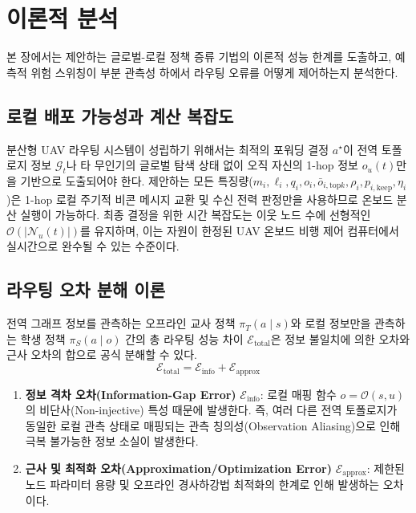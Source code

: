 \section{이론적 분석}
\label{sec:이론적분석}

본 장에서는 제안하는 글로벌-로컬 정책 증류 기법의 이론적 성능 한계를 도출하고, 예측적 위험 스위칭이 부분 관측성 하에서 라우팅 오류를 어떻게 제어하는지 분석한다.

\subsection{로컬 배포 가능성과 계산 복잡도}
분산형 UAV 라우팅 시스템이 성립하기 위해서는 최적의 포워딩 결정 $a^\star$이 전역 토폴로지 정보 $\mathcal{G}_t$나 타 무인기의 글로벌 탐색 상태 없이 오직 자신의 1-hop 정보 $o_u(t)$만을 기반으로 도출되어야 한다.  제안하는 모든 특징량($m_i, \ell_i, q_i, o_i, \bar{o}_{i,\mathrm{top}k}, \rho_i, p_{i,\mathrm{keep}}, \eta_i$)은 1-hop 로컬 주기적 비콘 메시지 교환 및 수신 전력 판정만을 사용하므로 온보드 분산 실행이 가능하다. 최종 결정을 위한 시간 복잡도는 이웃 노드 수에 선형적인 $\mathcal{O}(|\mathcal{N}_u(t)|)$를 유지하며, 이는 자원이 한정된 UAV 온보드 비행 제어 컴퓨터에서 실시간으로 완수될 수 있는 수준이다.

\subsection{라우팅 오차 분해 이론}
전역 그래프 정보를 관측하는 오프라인 교사 정책 $\pi_T(a \mid s)$와 로컬 정보만을 관측하는 학생 정책 $\pi_S(a \mid o)$ 간의 총 라우팅 성능 차이 $\mathcal{E}_{\mathrm{total}}$은 정보 불일치에 의한 오차와 근사 오차의 합으로 공식 분해할 수 있다.
\begin{equation}
    \mathcal{E}_{\mathrm{total}} = \mathcal{E}_{\mathrm{info}} + \mathcal{E}_{\mathrm{approx}}
\end{equation}
\begin{enumerate}
    \item \textbf{정보 격차 오차(Information-Gap Error)} $\mathcal{E}_{\mathrm{info}}$: 로컬 매핑 함수 $o = \mathcal{O}(s, u)$의 비단사(Non-injective) 특성 때문에 발생한다. 즉, 여러 다른 전역 토폴로지가 동일한 로컬 관측 상태로 매핑되는 관측 칭의성(Observation Aliasing)으로 인해 극복 불가능한 정보 소실이 발생한다.
    \item \textbf{근사 및 최적화 오차(Approximation/Optimization Error)} $\mathcal{E}_{\mathrm{approx}}$: 제한된 노드 파라미터 용량 및 오프라인 경사하강법 최적화의 한계로 인해 발생하는 오차이다.
\end{enumerate}


